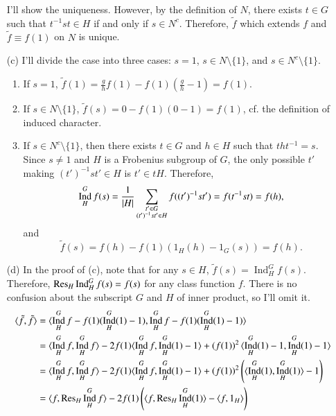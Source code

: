 \documentclass[a4paper, 12pt]{article}
\theoremstyle{Mydefinition}
\theoremstyle{Mytheorem}
\DeclareMathOperator{\Ind}{Ind}
\begin{document}
\begin{enumerate}
    I'll show the uniqueness. However, by the definition of $N$, there exists $t\in G$ such that $t^{-1}st\in H$ if and only if $s\in N^c$. Therefore, $\tilde{f}$ which extends $f$ and $\tilde{f}\equiv f(1)$ on $N$ is unique.
    \item[(c)] I'll divide the case into three cases: $s=1$, $s\in N\setminus\{1\}$, and $s\in N^c\setminus\{1\}$.
    \begin{enumerate}
        \item If $s=1$, $\tilde{f}(1) = \frac{g}{h}f(1) - f(1)\left(\frac{g}{h}-1\right) = f(1)$.
        \item If $s\in N\setminus\{1\}$, $\tilde{f}(s) = 0 - f(1)(0-1) = f(1)$, cf. the definition of induced character.
        \item If $s\in N^c\setminus\{1\}$, then there exists $t\in G$ and $h\in H$ such that $tht^{-1} = s$. Since $s\neq 1$ and $H$ is a Frobenius subgroup of $G$, the only possible $t'$ making $(t')^{-1}st'\in H$ is $t'\in tH$. Therefore,
        \begin{equation}
            \Ind_H^G f(s) = \frac{1}{\abs{H}}\sum_{\substack{t'\in G\\(t')^{-1}st'\in H}}f((t')^{-1}st') = f(t^{-1}st) = f(h),
        \end{equation}
        and
        \begin{equation}
            \tilde{f}(s) = f(h) - f(1)(1_H(h)-1_G(s)) = f(h).
        \end{equation}
    \end{enumerate}
    \item[(d)] In the proof of (c), note that for any $s\in H$, $\tilde{f}(s) = \Ind_H^Gf(s)$. Therefore, $\Res_H\Ind_H^Gf(s) = f(s)$ for any class function $f$. There is no confusion about the subscript $G$ and $H$ of inner product, so I'll omit it.
    \begin{equation}
    \begin{split}
        \langle \tilde{f}, \tilde{f}\rangle &= \langle \Ind_H^G f - f(1)(\Ind_H^G(1)-1), \Ind_H^G f - f(1)(\Ind_H^G(1)-1)\rangle \\
        &=\langle \Ind_H^G f, \Ind_H^G f \rangle - 2f(1)\langle \Ind_H^G f, \Ind_H^G(1)-1\rangle + \left(f(1)\right)^2\langle \Ind_H^G(1)-1, \Ind_H^G(1)-1\rangle\\
        &=\langle \Ind_H^G f, \Ind_H^G f \rangle - 2f(1)\langle \Ind_H^G f, \Ind_H^G(1)-1\rangle + \left(f(1)\right)^2\left(\langle \Ind_H^G(1), \Ind_H^G(1)\rangle-1\right)\\
        &=\langle f, \Res_H\Ind_H^G f \rangle - 2f(1)\left(\langle f, \Res_H\Ind_H^G(1)\rangle-\langle f, 1_H\rangle\right)\\

\end{split}
\end{equation}
\end{enumerate}
\end{document}
